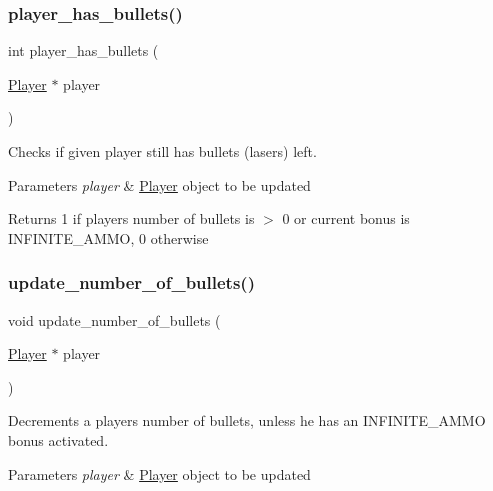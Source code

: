 \subsubsection{\texorpdfstring{player\+\_\+has\+\_\+bullets()}{player\_has\_bullets()}}
{\footnotesize\ttfamily int player\+\_\+has\+\_\+bullets (\begin{DoxyParamCaption}\item[{\hyperlink{struct_player}{Player} $\ast$}]{player }\end{DoxyParamCaption})}



Checks if given player still has bullets (lasers) left. 


\begin{DoxyParams}{Parameters}
{\em player} & \hyperlink{struct_player}{Player} \textquotesingle{}object\textquotesingle{} to be updated \\
\hline
\end{DoxyParams}
\begin{DoxyReturn}{Returns}
1 if player\textquotesingle{}s number of bullets is $>$ 0 or current bonus is I\+N\+F\+I\+N\+I\+T\+E\+\_\+\+A\+M\+MO, 0 otherwise 
\end{DoxyReturn}
\hypertarget{group__player_ga00245c5a0bd2c616f7bf886861cf0a59}{}\label{group__player_ga00245c5a0bd2c616f7bf886861cf0a59} 
\subsubsection{\texorpdfstring{update\+\_\+number\+\_\+of\+\_\+bullets()}{update\_number\_of\_bullets()}}
{\footnotesize\ttfamily void update\+\_\+number\+\_\+of\+\_\+bullets (\begin{DoxyParamCaption}\item[{\hyperlink{struct_player}{Player} $\ast$}]{player }\end{DoxyParamCaption})}



Decrements a player\textquotesingle{}s number of bullets, unless he has an I\+N\+F\+I\+N\+I\+T\+E\+\_\+\+A\+M\+MO bonus activated. 


\begin{DoxyParams}{Parameters}
{\em player} & \hyperlink{struct_player}{Player} \textquotesingle{}object\textquotesingle{} to be updated \\
\hline
\end{DoxyParams}
\hypertarget{group__player_ga985b6963134729213326a13697741bd2}{}\label{group__player_ga985b6963134729213326a13697741bd2} 
